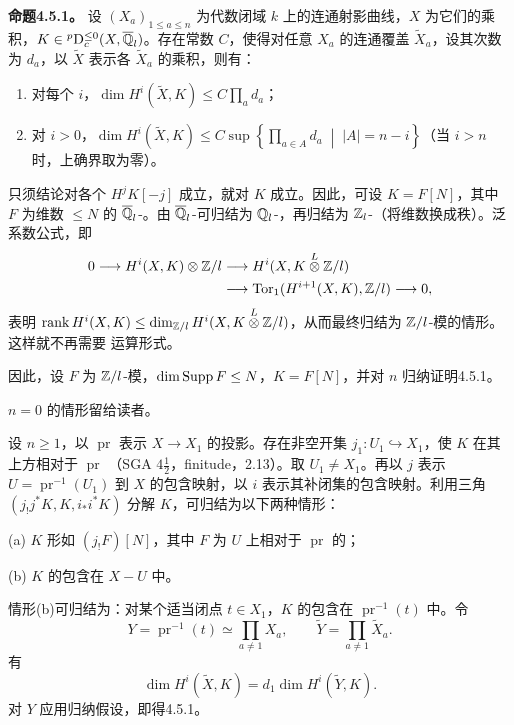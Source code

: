 \par\medskip\noindent\textbf{命题4.5.1。} 设 $(X_a)_{1\le a\le n}$ 为代数闭域 $k$ 上的连通射影曲线，$X$ 为它们的乘积，$K\in{}^p\mathrm{D}_c^{\le0}(X,\overline{\mathbb Q}_l)$。存在常数 $C$，使得对任意 $X_a$ 的连通覆盖 $\widetilde X_a$，设其次数为 $d_a$，以 $\widetilde X$ 表示各 $\widetilde X_a$ 的乘积，则有：
\begin{enumerate}[label=(\roman*)]
\item 对每个 $i$，$\displaystyle\dim H^i(\widetilde X,K)\le C\prod_a d_a$；
\item 对 $i>0$，$\displaystyle\dim H^i(\widetilde X,K)\le C\sup\left\{\prod_{a\in A}d_a\;\middle|\;|A|=n-i\right\}$（当 $i>n$ 时，上确界取为零）。
\end{enumerate}
只须结论对各个 $H^jK[-j]$ 成立，就对 $K$ 成立。因此，可设 $K=F[N]$，其中 $F$ 为维数 $\le N$ 的 $\overline{\mathbb Q}_l$-。由 $\overline{\mathbb Q}_l$-可归结为 $\mathbb Q_l$-，再归结为 $\mathbb Z_l$-（将维数换成秩）。泛系数公式，即
\[
\begin{aligned}
0\longrightarrow H^i(X,K)\otimes\mathbb Z/l&\longrightarrow H^i(X,K\overset L\otimes\mathbb Z/l)\\
&\longrightarrow\operatorname{Tor}_1(H^{i+1}(X,K),\mathbb Z/l)\longrightarrow0,
\end{aligned}
\]
表明 $\operatorname{rank} H^i(X,K)\le\dim_{\mathbb Z/l}H^i(X,K\overset L\otimes\mathbb Z/l)$，从而最终归结为 $\mathbb Z/l$-模的情形。这样就不再需要 运算形式。

因此，设 $F$ 为 $\mathbb Z/l$-模，$\dim\operatorname{Supp} F\le N$，$K=F[N]$，并对 $n$ 归纳证明4.5.1。

$n=0$ 的情形留给读者。

设 $n\ge1$，以 $\operatorname{pr}$ 表示 $X\to X_1$ 的投影。存在非空开集 $j_1:U_1\hookrightarrow X_1$，使 $K$ 在其上方相对于 $\operatorname{pr}$ （SGA $4\frac12$，finitude，2.13）。取 $U_1\ne X_1$。再以 $j$ 表示 $U=\operatorname{pr}^{-1}(U_1)$ 到 $X$ 的包含映射，以 $i$ 表示其补闭集的包含映射。利用三角 $(j_!j^*K,K,i_*i^*K)$ 分解 $K$，可归结为以下两种情形：

\noindent(a) $K$ 形如 $(j_!F)[N]$，其中 $F$ 为 $U$ 上相对于 $\operatorname{pr}$ 的；

\noindent(b) $K$ 的包含在 $X-U$ 中。

情形(b)可归结为：对某个适当闭点 $t\in X_1$，$K$ 的包含在 $\operatorname{pr}^{-1}(t)$ 中。令
\[Y=\operatorname{pr}^{-1}(t)\simeq\prod_{a\ne1}X_a,\qquad\widetilde Y=\prod_{a\ne1}\widetilde X_a.\]
有
\[\dim H^i(\widetilde X,K)=d_1\dim H^i(\widetilde Y,K).\]
对 $Y$ 应用归纳假设，即得4.5.1。

